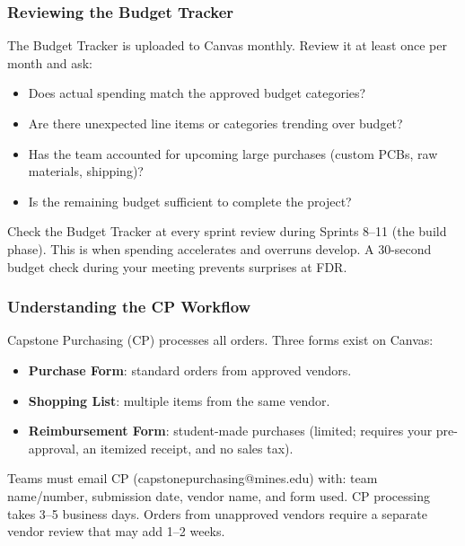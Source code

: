 \subsubsection{Reviewing the Budget Tracker}

The Budget Tracker is uploaded to Canvas monthly. Review it at least once per month and ask:

\begin{itemize}[nosep,leftmargin=1.5em]
\item Does actual spending match the approved budget categories?
\item Are there unexpected line items or categories trending over budget?
\item Has the team accounted for upcoming large purchases (custom PCBs, raw materials, shipping)?
\item Is the remaining budget sufficient to complete the project?
\end{itemize}

\begin{paaction}
Check the Budget Tracker at every sprint review during Sprints 8--11 (the build phase). This is when spending accelerates and overruns develop. A 30-second budget check during your meeting prevents surprises at FDR.
\end{paaction}

\subsubsection{Understanding the CP Workflow}

Capstone Purchasing (CP) processes all orders. Three forms exist on Canvas:

\begin{itemize}[nosep,leftmargin=1.5em]
\item \textbf{Purchase Form}: standard orders from approved vendors.
\item \textbf{Shopping List}: multiple items from the same vendor.
\item \textbf{Reimbursement Form}: student-made purchases (limited; requires your pre-approval, an itemized receipt, and no sales tax).
\end{itemize}

Teams must email CP (capstonepurchasing@mines.edu) with: team name/number, submission date, vendor name, and form used. CP processing takes 3--5 business days. Orders from unapproved vendors require a separate vendor review that may add 1--2 weeks.

